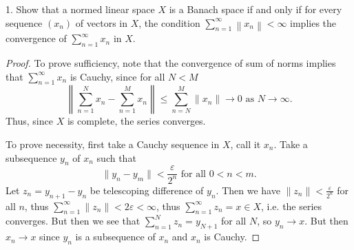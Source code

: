 \newpage
\begin{problem}
	1. Show that a normed linear space $X$ is a Banach space if and only if for every sequence $\left(x_n\right)$ of vectors in $X$, the condition $\sum_{n=1}^{\infty}\left\|x_n\right\|<\infty$ implies the convergence of $\sum_{n=1}^{\infty} x_n$ in $X$.
\end{problem}
\begin{proof}
	To prove sufficiency, note that the convergence of sum of norms implies that $\sum_{n = 1}^\infty x_n$ is Cauchy, since for all $N < M$
	\[
		\left\| \sum_{n = 1}^N x_n - \sum_{n = 1}^M x_n \right\| 
		\le 
		\sum_{n=N}^{M} \|x_n\| \to 0 \text{ as } N \to \infty 
	.\] 
	Thus, since $X$ is complete, the series converges.

	To prove necessity, first take a Cauchy sequence in $X$, call it $x_n$. Take a subsequence $y_n$ of $x_n$ such that
	\[
		\|y_n - y_m\| < \frac{\varepsilon}{2^n} \text{ for all } 0 < n < m
	.\] 
	Let $z_n = y_{n + 1} - y_n$ be telescoping difference of  $y_n$. Then we have $\|z_n\| < \frac{\varepsilon}{2^n} $ for all $n$, thus $\sum_{n=1}^{\infty} \|z_n\| < 2 \varepsilon < \infty  $, thus $\sum_{n=1}^{\infty} z_n = x \in X$, i.e. the series converges. But then we see that $\sum_{n=1}^{N} z_n = y_{N+1}$ for all $N$, so $y_n \to  x$. But then $x_n \to  x$ since $y_n$ is a subsequence of $x_n$ and $x_n$ is Cauchy.
\end{proof}


